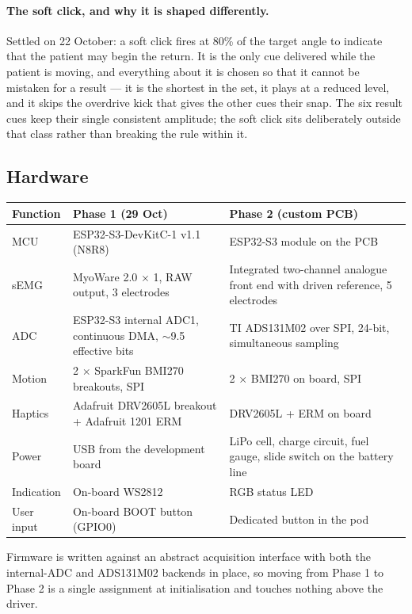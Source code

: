 \documentclass[11pt]{article}
\begin{document}
\paragraph{The soft click, and why it is shaped differently.} Settled on
22 October: a soft click fires at 80\% of the target angle to indicate that the
patient may begin the return. It is the only cue delivered while the patient is
moving, and everything about it is chosen so that it cannot be mistaken for a
result --- it is the shortest in the set, it plays at a reduced level, and it
skips the overdrive kick that gives the other cues their snap. The six result
cues keep their single consistent amplitude; the soft click sits deliberately
outside that class rather than breaking the rule within it.

\subsection{Hardware}

\begin{table}[H]
\centering\small
\begin{tabularx}{\linewidth}{@{}p{26mm} p{40mm} X@{}}
\toprule
\textbf{Function} & \textbf{Phase 1 (29 Oct)} & \textbf{Phase 2 (custom PCB)} \\
\midrule
MCU & ESP32-S3-DevKitC-1 v1.1 (N8R8) & ESP32-S3 module on the PCB \\
sEMG & MyoWare 2.0 $\times$ 1, RAW output, 3 electrodes & Integrated two-channel analogue front end with driven reference, 5 electrodes \\
ADC & ESP32-S3 internal ADC1, continuous DMA, $\sim$9.5 effective bits & TI ADS131M02 over SPI, 24-bit, simultaneous sampling \\
Motion & 2 $\times$ SparkFun BMI270 breakouts, SPI & 2 $\times$ BMI270 on board, SPI \\
Haptics & Adafruit DRV2605L breakout + Adafruit 1201 ERM & DRV2605L + ERM on board \\
Power & USB from the development board & LiPo cell, charge circuit, fuel gauge, slide switch on the battery line \\
Indication & On-board WS2812 & RGB status LED \\
User input & On-board BOOT button (GPIO0) & Dedicated button in the pod \\
\bottomrule
\end{tabularx}
\end{table}

\noindent
Firmware is written against an abstract acquisition interface with both the
internal-ADC and ADS131M02 backends in place, so moving from Phase 1 to Phase 2
is a single assignment at initialisation and touches nothing above the driver.
\end{document}
